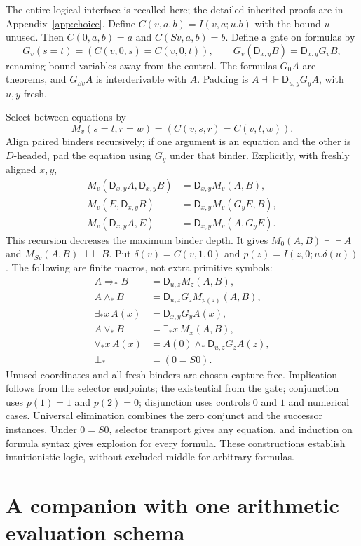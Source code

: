 \documentclass[11pt]{article}
\theoremstyle{definition}
\newcommand{\D}{\mathsf D}
\begin{document}
The entire logical interface is recalled here; the detailed inherited
proofs are in Appendix~\ref{app:choice}. Define
$C(v,a,b)=I(v,a;u.b)$ with the bound $u$ unused. Then
$C(0,a,b)=a$ and $C(Sv,a,b)=b$.
Define a gate on formulas by
\[
 G_v(s=t)=(C(v,0,s)=C(v,0,t)),\qquad
 G_v(\D_{x,y}B)=\D_{x,y}G_vB,
\]
renaming bound variables away from the control. The formulas $G_0A$ are
theorems, and $G_{Sv}A$ is interderivable with $A$. Padding is
$A\dashv\vdash\D_{u,y}G_yA$, with $u,y$ fresh.

Select between equations by
\[
 M_v(s=t,r=w)=(C(v,s,r)=C(v,t,w)).
\]
Align paired binders recursively; if one argument is an equation and the
other is $D$-headed, pad the equation using $G_y$ under that binder.
Explicitly, with freshly aligned $x,y$,
\[
\begin{aligned}
 M_v(\D_{x,y}A,\D_{x,y}B)&=\D_{x,y}M_v(A,B),\\
 M_v(E,\D_{x,y}B)&=\D_{x,y}M_v(G_yE,B),\\
 M_v(\D_{x,y}A,E)&=\D_{x,y}M_v(A,G_yE).
\end{aligned}
\]
This recursion decreases the maximum binder depth. It gives
$M_0(A,B)\dashv\vdash A$ and $M_{Sv}(A,B)\dashv\vdash B$.
Put $\delta(v)=C(v,1,0)$ and $p(z)=I(z,0;u.\delta(u))$.
The following are finite macros, not extra primitive symbols:
\[
\begin{aligned}
 A\Rightarrow_*B&=\D_{u,z}M_z(A,B),\\
 A\wedge_*B&=\D_{u,z}G_zM_{p(z)}(A,B),\\
 \exists_*x\,A(x)&=\D_{x,y}G_yA(x),\\
 A\vee_*B&=\exists_*x\,M_x(A,B),\\
 \forall_*x\,A(x)&=A(0)\wedge_*\D_{u,z}G_zA(z),\\
 \bot_*&=(0=S0).
\end{aligned}
\tag{Logic}\label{eq:logic}
\]
Unused coordinates and all fresh binders are chosen capture-free.
Implication follows from the selector endpoints; the existential from
the gate; conjunction uses $p(1)=1$ and $p(2)=0$; disjunction uses
controls $0$ and $1$ and numerical cases. Universal elimination combines
the zero conjunct and the successor instances. Under $0=S0$, selector
transport gives any equation, and induction on formula syntax gives
explosion for every formula. These constructions establish intuitionistic
logic, without excluded middle for arbitrary formulas.

\section{A companion with one arithmetic evaluation schema}
\label{sec:canonical}
\end{document}
